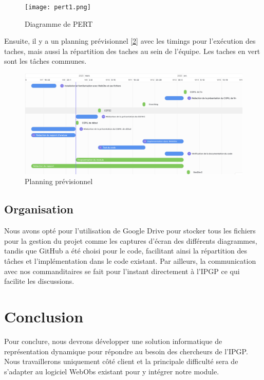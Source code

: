 \documentclass[11pt]{article}
\begin{document}
\begin{figure}[h!]
    \centering 
    \texttt{[image: pert1.png]} 
    \caption{Diagramme de PERT} 
    \label{pert}
\end{figure}

\newpage

Ensuite, il y a un planning prévisionnel [\ref{plan}] avec les timings pour l'exécution des taches, mais aussi la répartition des taches au sein de l'équipe. Les taches en vert sont les tâches communes.

\begin{figure}[h!]
    \centering 
    \includegraphics[width=18cm]{Plan.png} 
    \caption{Planning prévisionnel} 
    \label{plan}
\end{figure}

\subsection{Organisation}

Nous avons opté pour l'utilisation de Google Drive pour stocker tous les fichiers pour la gestion du projet comme les captures d'écran des différents diagrammes, tandis que GitHub a été choisi pour le code, facilitant ainsi la répartition des tâches et l'implémentation dans le code existant. Par ailleurs, la communication avec nos commanditaires se fait pour l'instant directement à l'IPGP ce qui facilite les discussions.



\section{Conclusion}

Pour conclure, nous devrons développer une solution informatique de représentation dynamique pour répondre au besoin des chercheurs de l'IPGP. Nous travaillerons uniquement côté client et la principale difficulté sera de s'adapter au logiciel WebObs existant pour y intégrer notre module.
\end{document}
